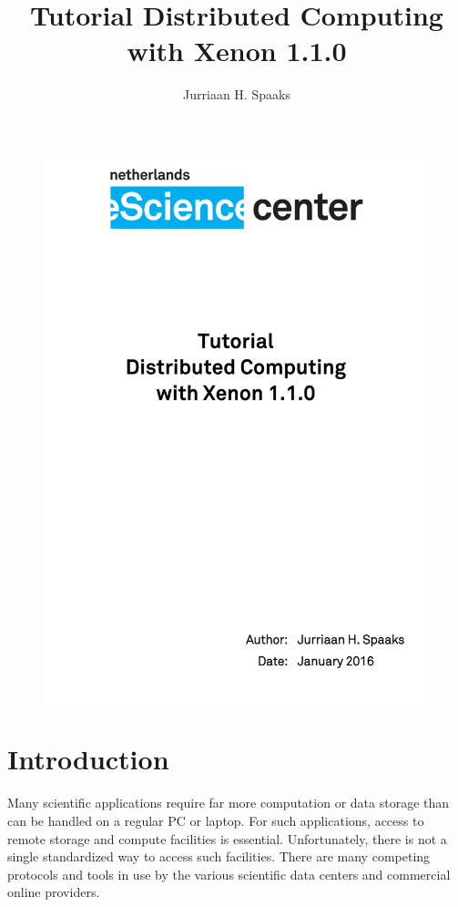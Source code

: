 \documentclass[12pt, a4paper, twoside, openany, titlepage]{book}
\author{Jurriaan H. Spaaks}
\title{\textbf{Tutorial Distributed Computing with Xenon 1.1.0}}
\begin{document}

\pagestyle{empty}

\begin{figure}[ht]
\centering
\includegraphics[width=1.0\columnwidth]{images/cover}
\end{figure}

\clearpage
{}
\frontmatter
\pagestyle{plain}
\tableofcontents

\mainmatter



\chapter{Introduction}

Many scientific applications require far more computation or data storage than can be handled on a regular PC or laptop. For such applications, access to remote storage and compute facilities is essential. Unfortunately, there is not a single standardized way to access such facilities. There are many competing protocols and tools in use by the various scientific data centers and commercial online providers.
\end{document}
